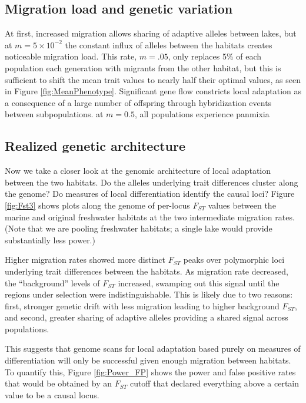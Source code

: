 \documentclass{article}
\newcommand{\plr}[1]{\todo[linecolor=blue,backgroundcolor=blue!25,bordercolor=blue]{#1}}
\begin{document}

\subsection*{Migration load and genetic variation}

At first, increased migration allows sharing of adaptive alleles between lakes,
but at $m = 5 \times 10^{-2}$
the constant influx of alleles between the habitats creates noticeable migration load.
This rate, $m=.05$, only replaces 5\% of each population each generation
with migrants from the other habitat, but this is sufficient to shift the mean trait values
to nearly half their optimal values, as seen in Figure \ref{fig:MeanPhenotype}.
Significant gene flow constricts local adaptation
as a consequence of a large number of offspring through hybridization events between subpopulations.
at $m=0.5$, all populations experience panmixia 

\subsection*{Realized genetic architecture}
Now we take a closer look at the genomic architecture of local adaptation between the two habitats. Do the alleles underlying trait differences cluster along the genome?
Do measures of local differentiation identify the causal loci? Figure \ref{fig:Fst3} shows plots along the genome of per-locus $F_{ST}$ values between the marine and original freshwater habitats at the two intermediate migration rates. (Note that we are pooling freshwater habitats; a single lake would provide substantially less power.)

\plr{need to know where the FAA are in these figures}

Higher migration rates showed more distinct $F_{ST}$ peaks over polymorphic loci underlying trait differences between the habitats. As migration rate decreased, the ``background'' levels of $F_{ST}$ increased, swamping out this signal until the regions under selection were indistinguishable. This is likely due to two reasons: first, stronger genetic drift with less migration leading to higher background $F_{ST}$, and second, greater sharing of adaptive alleles providing a shared signal across populations.

This suggests that genome scans for local adaptation based purely on measures of differentiation will only be successful given enough migration between habitats. To quantify this, Figure \ref{fig:Power_FP} shows the power and false positive rates that would be obtained by an $F_{ST}$ cutoff that declared everything above a certain value to be a causal locus.
\end{document}
